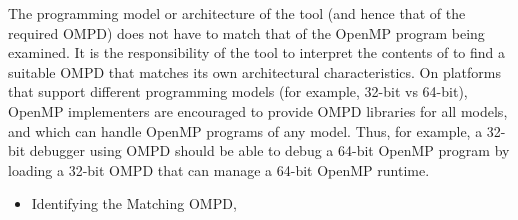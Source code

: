 The programming model or architecture of the tool (and hence
that of the required OMPD) does not have to match that of the OpenMP program
being examined.
It is the responsibility of the tool to interpret the contents
of  to find a suitable OMPD that matches
its own architectural characteristics.
On platforms that support different programming models
(for example, 32-bit vs 64-bit), OpenMP implementers are encouraged
to provide OMPD libraries for all models, and which can handle
OpenMP programs of any model.
Thus, for example, a 32-bit debugger using OMPD should be able
to debug a 64-bit OpenMP program
by loading a 32-bit OMPD that can manage a 64-bit OpenMP runtime.

\crossreferences
\begin{itemize}
	\item Identifying the Matching OMPD, 
\end{itemize}



